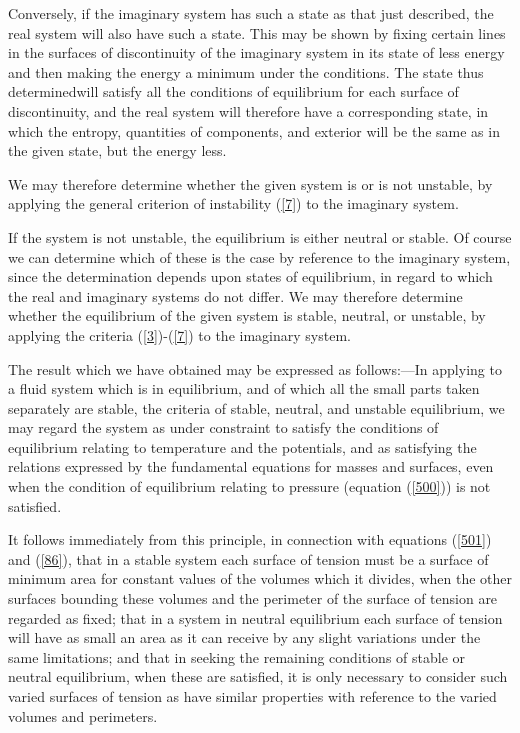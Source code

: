 \documentclass[12pt]{article}
\begin{document}
{Conversely, if the imaginary system has such a state as that just described, the real system will also have such a state. This may be shown by fixing certain lines in the surfaces of discontinuity of the imaginary system in its state of less energy and then making the energy a minimum under the conditions. The state thus determinedwill satisfy all the conditions of equilibrium for each surface of discontinuity, and the real system will therefore have a corresponding state, in which the entropy, quantities of components, and exterior will be the same as in the given state, but the energy less.

We may therefore determine whether the given system is or is not unstable, by applying the general criterion of instability (\ref{7}) to the imaginary system.

If the system is not unstable, the equilibrium is either neutral or stable. Of course we can determine which of these is the case by reference to the imaginary system, since the determination depends upon states of equilibrium, in regard to which the real and imaginary systems do not differ. We may therefore determine whether the equilibrium of the given system is stable, neutral, or unstable, by applying the criteria (\ref{3})-(\ref{7}) to the imaginary system.

The result which we have obtained may be expressed as follows:---In applying to a fluid system which is in equilibrium, and of which all the small parts taken separately are stable, the criteria of stable, neutral, and unstable equilibrium, we may regard the system as under constraint to satisfy the conditions of equilibrium relating to temperature and the potentials, and as satisfying the relations expressed by the fundamental equations for masses and surfaces, even when the condition of equilibrium relating to pressure (equation (\ref{500})) is not satisfied.

It follows immediately from this principle, in connection with equations (\ref{501}) and (\ref{86}), that in a stable system each surface of tension must be a surface of minimum area for constant values of the volumes which it divides, when the other surfaces bounding these volumes and the perimeter of the surface of tension are regarded as fixed; that in a system in neutral equilibrium each surface of tension will have as small an area as it can receive by any slight variations under the same limitations; and that in seeking the remaining conditions of stable or neutral equilibrium, when these are satisfied, it is only necessary to consider such varied surfaces of tension as have similar properties with reference to the varied volumes and perimeters.

}
\end{document}
